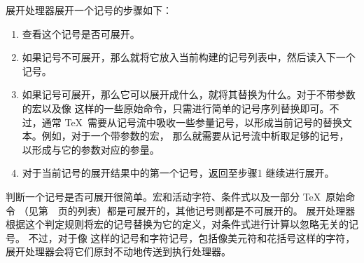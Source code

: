 \documentclass{book}
\begin{document}
展开处理器展开一个记号的步骤如下：
\begin{enumerate}
\item 查看这个记号是否可展开。
\item 如果记号不可展开，那么就将它放入当前构建的记号列表中，然后读入下一个记号。

\item 如果记号可展开，那么它可以展开成什么，就将其替换为什么。对于不带参数的宏以及像
 这样的一些原始命令，只需进行简单的记号序列替换即可。不过，通常 \TeX\
需要从记号流中吸收一些参量记号，以形成当前记号的替换文本。例如，对于一个带参数的宏，
那么就需要从记号流中析取足够的记号，以形成与它的参数对应的参量。

\item 对于当前记号的展开结果中的第一个记号，返回至步骤1 继续进行展开。
\end{enumerate}
%
判断一个记号是否可展开很简单。宏和活动字符、条件式以及一部分 \TeX\ 原始命令%
（见第~\pageref{expand:lijst}~页的列表）都是可展开的，其他记号则都是不可展开的。
展开处理器根据这个判定规则将宏的记号替换为它的定义，对条件式进行计算以忽略无关的记号。
不过，对于像  这样的记号和字符记号，包括像美元符和花括号这样的字符，
展开处理器会将它们原封不动地传送到执行处理器。
\end{document}
